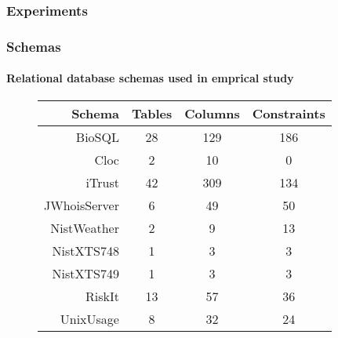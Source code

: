  \begin{frame}
        \frametitle{Experiments}
        \centering
        
        
\end{frame}

\begin{frame}
  \frametitle{Schemas}
  \framesubtitle{Relational database schemas used in emprical study}

  \begin{figure}
  \begin{center}
  {\normalsize
  \begin{tabular}{r | c c c}
                           Schema & Tables & Columns & Constraints \\ \hline
    BioSQL                        & 28     & 129     & 186 \\
    Cloc                          & 2      & 10      & 0 \\
    iTrust                        & 42     & 309     & 134 \\
    JWhoisServer                  & 6      & 49      & 50 \\
    NistWeather                   & 2      & 9       & 13 \\
    NistXTS748                    & 1      & 3       & 3 \\
    NistXTS749                    & 1      & 3       & 3 \\
    RiskIt                        & 13     & 57      & 36 \\
    UnixUsage                     & 8      & 32      & 24
\end{tabular}}
\end{center}
\end{figure}



\begin{minipage}{1.5in}
\begin{figure}
\begin{centering}
\end{centering}
\end{figure}
\end{minipage}


\end{frame}
